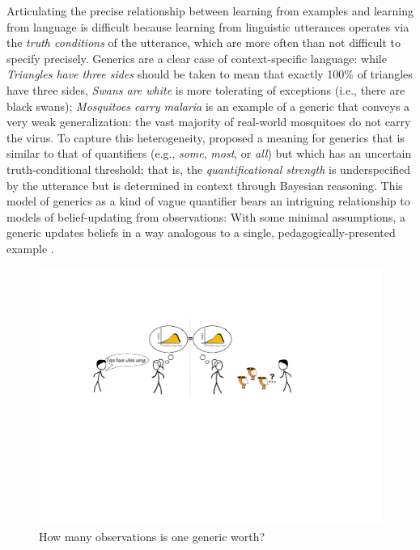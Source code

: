\documentclass[10pt,letterpaper]{article}
\newcommand{\mht}[1]{\textcolor{Blue}{[mht: #1]}}
\begin{document}

Articulating the precise relationship between learning from examples and learning from language is difficult because learning from linguistic utterances operates via the \emph{truth conditions} of the utterance, which are more often than not difficult to specify precisely. %
Generics are a clear case of context-specific language:  while \emph{Triangles have three sides} should be taken to mean that exactly 100\% of triangles have three sides, \emph{Swans are white} is more tolerating of exceptions (i.e., there are black swans); \emph{Mosquitoes carry malaria} is an example of a generic that conveys a very weak generalization: the vast majority of real-world mosquitoes do not carry the virus. 
To capture this heterogeneity,  proposed a meaning for generics that is similar to that of quantifiers (e.g., \emph{some}, \emph{most}, or \emph{all}) but which has an uncertain truth-conditional threshold; that is, the \emph{quantificational strength} is underspecified by the utterance but is determined in context through Bayesian reasoning. 
This model of generics as a kind of vague quantifier bears an intriguing relationship to models of belief-updating from observations: With some minimal assumptions, a generic updates beliefs in a way analogous to a single, pedagogically-presented example \cite{tessler2020learning}. 

\begin{figure}[t]
\begin{center}
\includegraphics[width=\linewidth]{figs/cartoon-fig.pdf}
\end{center}
\caption{How many observations is one generic worth?}
\label{fig:cartoon}
\end{figure}
\end{document}
